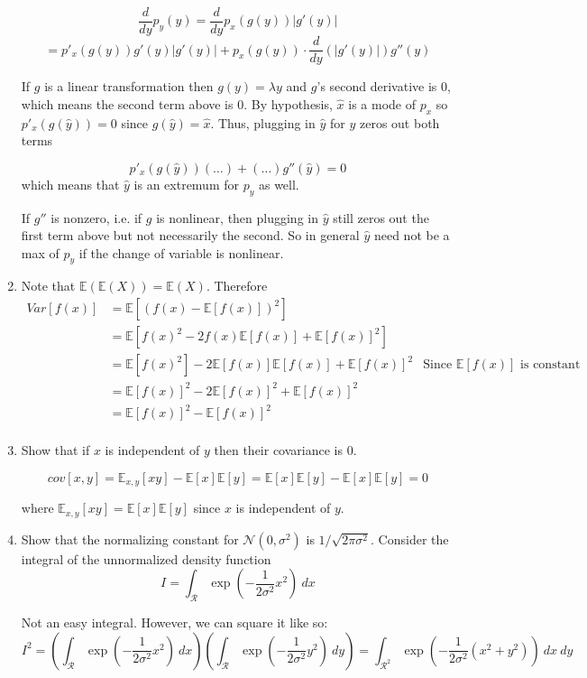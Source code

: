 \documentclass[../main.tex]{subfiles}
\begin{document}
\begin{enumerate}
$$\frac{d}{dy}p_y(y) = \frac{d}{dy}p_x(g(y))|g'(y)|$$
$$=p'_x(g(y))g'(y)|g'(y)| + p_x(g(y))\cdot \frac{d}{dy}\left(|g'(y)|\right)g''(y)$$

If $g$ is a linear transformation then $g(y) = \lambda y$ and $g$'s second derivative is 0, which means the second term above is 0. By hypothesis, $\hat{x}$ is a mode of $p_x$ so $p'_x(g(\hat{y})) = 0$ since $g(\hat{y}) = \hat{x}$. Thus, plugging in $\hat{y}$ for $y$ zeros out both terms

$$p'_x(g(\hat{y}))(\ldots) + (\ldots)g''(\hat{y}) = 0$$
which means that $\hat{y}$ is an extremum for $p_y$ as well. 

If $g''$ is nonzero, i.e. if $g$ is nonlinear, then plugging in $\hat{y}$ still zeros out the first term above but not necessarily the second. So in general $\hat{y}$ need not be a max of $p_y$ if the change of variable is nonlinear.

\item Note that $\mathbb{E}(\mathbb{E}(X)) = \mathbb{E}(X)$. Therefore
\begin{align*}
	Var[f(x)] &= \mathbb{E}\left[(f(x) - \mathbb{E}[f(x)])^2\right] \\
	&= \mathbb{E}\left[f(x)^2 - 2f(x)\mathbb{E}[f(x)] + \mathbb{E}[f(x)]^2\right] \\
	&= \mathbb{E}[f(x)^2] - 2\mathbb{E}[f(x)]\mathbb{E}[f(x)] + \mathbb{E}[f(x)]^2 &\text{Since $\mathbb{E}[f(x)]$ is constant}\\
	&= \mathbb{E}[f(x)]^2 - 2\mathbb{E}[f(x)]^2 + \mathbb{E}[f(x)]^2 \\
	&= \mathbb{E}[f(x)]^2 - \mathbb{E}[f(x)]^2\\
\end{align*}

\item Show that if $x$ is independent of $y$ then their covariance is 0.


$$cov[x,y] = \mathbb{E}_{x,y}[xy] - \mathbb{E}[x]\mathbb{E}[y] = \mathbb{E}[x]\mathbb{E}[y] - \mathbb{E}[x]\mathbb{E}[y] = 0
$$

where $\mathbb{E}_{x,y}[xy] = \mathbb{E}[x]\mathbb{E}[y]$ since $x$ is independent of $y$.

\item Show that the normalizing constant for $\mathcal{N}(0, \sigma^2)$ is $1/\sqrt{2\pi \sigma^2}$. Consider the integral of the unnormalized density function
$$I = \int_{\mathcal{R}} \exp\left(-\frac{1}{2\sigma^2}x^2\right) \ dx$$

Not an easy integral. However, we can square it like so:
$$I^2 = \left(\int_{\mathcal{R}} \exp\left(-\frac{1}{2\sigma^2}x^2\right) \ dx\right)\left(\int_{\mathcal{R}} \exp\left(-\frac{1}{2\sigma^2}y^2\right) \ dy\right) = \int_{\mathcal{R}^2} \exp\left(-\frac{1}{2\sigma^2}(x^2 + y^2)\right) \ dx\ dy$$


\end{enumerate}
\end{document}
